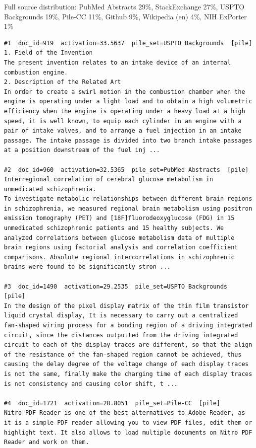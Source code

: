 Full source distribution: PubMed Abstracts 29\%, StackExchange 27\%, USPTO Backgrounds 19\%, Pile-CC 11\%, Github 9\%, Wikipedia (en) 4\%, NIH ExPorter 1\%

\begin{verbatim}
#1  doc_id=919  activation=33.5637  pile_set=USPTO Backgrounds  [pile]
1. Field of the Invention
The present invention relates to an intake device of an internal combustion engine.
2. Description of the Related Art
In order to create a swirl motion in the combustion chamber when the engine is operating under a light load and to obtain a high volumetric efficiency when the engine is operating under a heavy load at a high speed, it is well known, to equip each cylinder in an engine with a pair of intake valves, and to arrange a fuel injection in an intake passage. The intake passage is divided into two branch intake passages at a position downstream of the fuel inj ...

#2  doc_id=960  activation=32.5365  pile_set=PubMed Abstracts  [pile]
Interregional correlation of cerebral glucose metabolism in unmedicated schizophrenia.
To investigate metabolic relationships between different brain regions in schizophrenia, we measured regional brain metabolism using positron emission tomography (PET) and [18F]fluorodeoxyglucose (FDG) in 15 unmedicated schizophrenic patients and 15 healthy subjects. We analyzed correlations between glucose metabolism data of multiple brain regions using factorial analysis and correlation coefficient comparisons. Absolute regional intercorrelations in schizophrenic brains were found to be significantly stron ...

#3  doc_id=1490  activation=29.2535  pile_set=USPTO Backgrounds  [pile]
In the design of the pixel display matrix of the thin film transistor liquid crystal display, It is necessary to carry out a centralized fan-shaped wiring process for a bonding region of a driving integrated circuit, since the distances outputted from the driving integrated circuit to each of the display traces are different, so that the align of the resistance of the fan-shaped region cannot be achieved, thus causing the delay degree of the voltage change of each display traces is not the same, finally make the charging time of each display traces is not consistency and causing color shift, t ...

#4  doc_id=1721  activation=28.8051  pile_set=Pile-CC  [pile]
Nitro PDF Reader is one of the best alternatives to Adobe Reader, as it is a simple PDF reader allowing you to view PDF files, edit them or highlight text. It also allows to load multiple documents on Nitro PDF Reader and work on them.


\end{verbatim}
